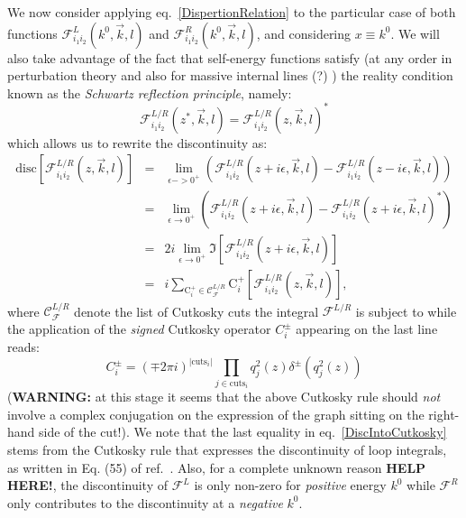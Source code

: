 \documentclass[11pt]{article}
\begin{document}
We now consider applying eq.~\ref{DispertionRelation} to the particular case of both functions $\mathcal{F}^L_{i_1i_2}(k^0,\vec{k},l)$ and $\mathcal{F}^R_{i_1i_2}(k^0,\vec{k},l)$, and considering $x\equiv k^0$.
We will also take advantage of the fact that self-energy functions satisfy (at any order in perturbation theory and also for massive internal lines (?) ) the reality condition known as the \emph{Schwartz reflection principle}, namely:
\begin{equation}
\mathcal{F}^{L/R}_{i_1i_2}(z^*, \vec{k},l)=\mathcal{F}^{L/R}_{i_1i_2}(z, \vec{k},l)^*
\end{equation}
which allows us to rewrite the discontinuity as:
\begin{eqnarray}
\textrm{disc} \left[ \mathcal{F}^{L/R}_{i_1i_2}(z, \vec{k},l) \right] &=& \lim_{\epsilon->0^+} \left( \mathcal{F}^{L/R}_{i_1i_2}(z+i\epsilon, \vec{k},l) - \mathcal{F}^{L/R}_{i_1i_2}(z-i\epsilon, \vec{k},l) \right ) \nonumber \\
&=&  \lim_{\epsilon \rightarrow 0^+} \left( \mathcal{F}^{L/R}_{i_1i_2}(z+i\epsilon, \vec{k},l) - \mathcal{F}^{L/R}_{i_1i_2}(z+i\epsilon, \vec{k},l)^* \right )\nonumber \\
&=&  2 i \lim_{\epsilon \rightarrow 0^+}  \Im{ \left[ \mathcal{F}^{L/R}_{i_1i_2}(z+i\epsilon, \vec{k},l) \right] } \nonumber \\
&=&  i \sum_{\textrm{C}^+_i\in \mathcal{C}_\mathcal{F}^{L/R}} \textrm{C}^+_i\left[ \mathcal{F}^{L/R}_{i_1i_2}(z, \vec{k},l)\right ],
\label{DiscIntoCutkosky}
\end{eqnarray}
where $\mathcal{C}_\mathcal{F}^{L/R}$ denote the list of Cutkosky cuts the integral $\mathcal{F}^{L/R}$ is subject to while the application of the \emph{signed} Cutkosky operator $C^{\pm}_i$ appearing on the last line reads:
\begin{equation}
C^{\pm}_i = (\mp2\pi i)^{|\textrm{cuts}_i|} \prod_{j\in \textrm{cuts}_i} q_j^2(z) \delta^{\pm}\left(q_j^2(z)\right)
\end{equation}
({\bf WARNING:} at this stage it seems that the above Cutkosky rule should \emph{not} involve a complex conjugation on the expression of the graph sitting on the right-hand side of the cut!).
We note that the last equality in eq.~\ref{DiscIntoCutkosky} stems from the Cutkosky rule that expresses the discontinuity of loop integrals, as written in Eq. (55) of ref.~\cite{Zwicky:2016lka}.
Also, for a complete unknown reason {\bf{HELP HERE!}}, the discontinuity of $\mathcal{F}^{L}$ is only non-zero for \emph{positive} energy $k^0$ while $\mathcal{F}^{R}$ only contributes to the discontinuity at a \emph{negative} $k^0$.
\end{document}
